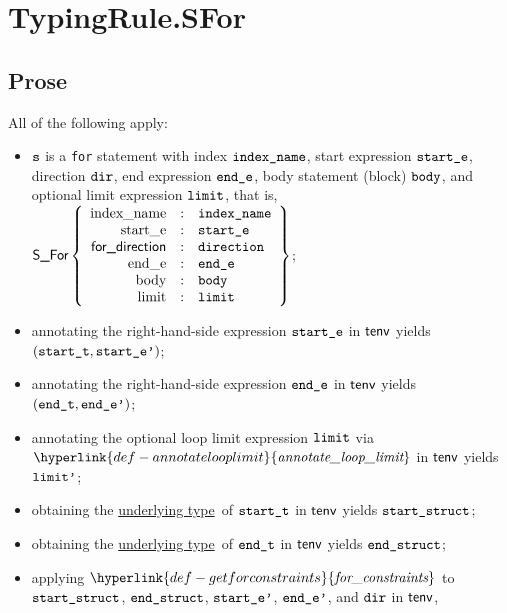 \documentclass{book}
\newcommand\ProseOrTypeError[0]{\ProseTerminateAs{\TypeErrorConfig}}
\newcommand\getforconstraints[0]{\hyperlink{def-getforconstraints}{\textfunc{for\_constraints}}}
\newcommand\underlyingtype[0]{\hyperlink{def-underlyingtype}{underlying type}}
\newcommand\annotatelooplimit[0]{\hyperlink{def-annotatelooplimit}{\textfunc{annotate\_loop\_limit}}}
\begin{document}

\section{TypingRule.SFor \label{sec:TypingRule.SFor}}
\subsection{Prose}
All of the following apply:
\begin{itemize}
  \item $\texttt{s}$ is a \texttt{for} statement with index $\texttt{index\_name}$,
        start expression $\texttt{start\_e}$,
        direction $\texttt{dir}$,
        end expression $\texttt{end\_e}$,
        body statement (block) $\texttt{body}$,
        and optional limit expression $\texttt{limit}$,
        that is, $\textsf{S\_For}\left\{\begin{array}{rcl}
          \text{index\_name} &:& \texttt{index\_name}\\
          \text{start\_e} &:& \texttt{start\_e}\\
          \textsf{for\_direction} &:& \texttt{direction}\\
          \text{end\_e} &:& \texttt{end\_e}\\
          \text{body} &:& \texttt{body}\\
          \text{limit} &:& \texttt{limit}
        \end{array}\right\}$;
  \item annotating the right-hand-side expression $\texttt{start\_e}$ in $\textsf{tenv}$ yields \\
        $(\texttt{start\_t}, \texttt{start\_e'})$\ProseOrTypeError;
  \item annotating the right-hand-side expression $\texttt{end\_e}$ in $\textsf{tenv}$ yields $(\texttt{end\_t}, \texttt{end\_e'})$\ProseOrTypeError;
  \item annotating the optional loop limit expression $\texttt{limit}$ via $\annotatelooplimit$ in $\textsf{tenv}$
        yields $\texttt{limit'}$\ProseOrTypeError;
  \item obtaining the \underlyingtype\ of $\texttt{start\_t}$ in $\textsf{tenv}$ yields $\texttt{start\_struct}$\ProseOrTypeError;
  \item obtaining the \underlyingtype\ of $\texttt{end\_t}$ in $\textsf{tenv}$ yields $\texttt{end\_struct}$\ProseOrTypeError;
  \item applying $\getforconstraints$ to $\texttt{start\_struct}$, $\texttt{end\_struct}$,
        $\texttt{start\_e'}$, $\texttt{end\_e'}$, and $\texttt{dir}$ in $\textsf{tenv}$,

\end{itemize}
\end{document}
